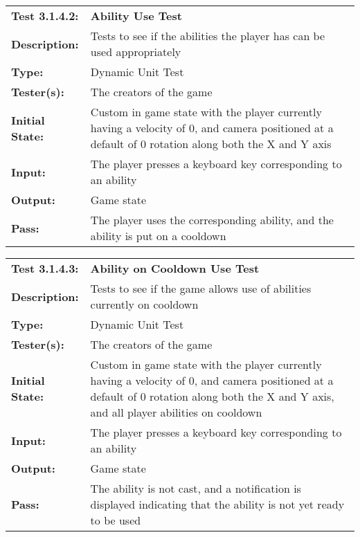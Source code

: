 \documentclass[12pt, titlepage]{article}
\begin{document}
\begin{mdframed}[linewidth=1pt]
\begin{tabularx}{\textwidth}{@{}p{3cm}X@{}}
{\bf Test 3.1.4.2:} & {\bf Ability Use Test}\\[\baselineskip]
{\bf Description:} & Tests to see if the abilities the player has can be used appropriately \\[0.5\baselineskip]
{\bf Type:} & Dynamic Unit Test\\[0.5\baselineskip]
{\bf Tester(s):} & The creators of the game\\[0.5\baselineskip]
{\bf Initial State:} & Custom in game state with the player currently having a velocity of 0, and camera positioned at a default of 0 rotation along both the X and Y axis\\[0.5\baselineskip]
{\bf Input:} & The player presses a keyboard key corresponding to an ability \\[0.5\baselineskip]
{\bf Output:} & Game state\\[0.5\baselineskip]
{\bf Pass:} & The player uses the corresponding ability, and the ability is put on a cooldown
\end{tabularx}
\end{mdframed}

\begin{mdframed}[linewidth=1pt]
\begin{tabularx}{\textwidth}{@{}p{3cm}X@{}}
{\bf Test 3.1.4.3:} & {\bf Ability on Cooldown Use Test}\\[\baselineskip]
{\bf Description:} & Tests to see if the game allows use of abilities currently on cooldown\\[0.5\baselineskip]
{\bf Type:} & Dynamic Unit Test\\[0.5\baselineskip]
{\bf Tester(s):} & The creators of the game\\[0.5\baselineskip]
{\bf Initial State:} & Custom in game state with the player currently having a velocity of 0, and camera positioned at a default of 0 rotation along both the X and Y axis, and all player abilities on cooldown\\[0.5\baselineskip]
{\bf Input:} & The player presses a keyboard key corresponding to an ability \\[0.5\baselineskip]
{\bf Output:} & Game state\\[0.5\baselineskip]
{\bf Pass:} & The ability is not cast, and a notification is displayed indicating that the ability is not yet ready to be used
\end{tabularx}
\end{mdframed}
\end{document}
